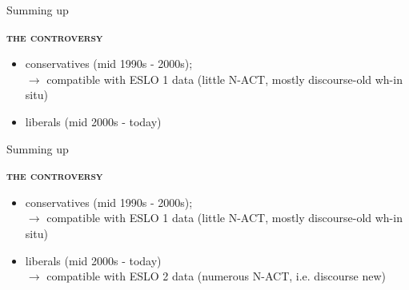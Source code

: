 \documentclass[lesson_slides]{subfiles}
\begin{document}
\begin{frame}[c]{Summing up}

    \textbf{\textsc{the controversy}}
    \begin{itemize}
        \item[\ding{227}] conservatives (mid 1990s - 2000s);\\ $\longrightarrow$ compatible with ESLO 1 data \pause (little N-ACT, mostly discourse-old wh-in situ)
        \item[\ding{227}] liberals (mid 2000s - today)\\
    \end{itemize}
  
\end{frame}
\begin{frame}[c]{Summing up}

    \textbf{\textsc{the controversy}}
    \begin{itemize}
        \item[\ding{227}] conservatives (mid 1990s - 2000s);\\ $\longrightarrow$ compatible with ESLO 1 data (little N-ACT, mostly discourse-old wh-in situ)
        \item[\ding{227}] liberals (mid 2000s - today)\\
        $\longrightarrow$ compatible with ESLO 2 data \pause (numerous N-ACT, i.e. discourse new)
    \end{itemize}
  
\end{frame}
\end{document}
